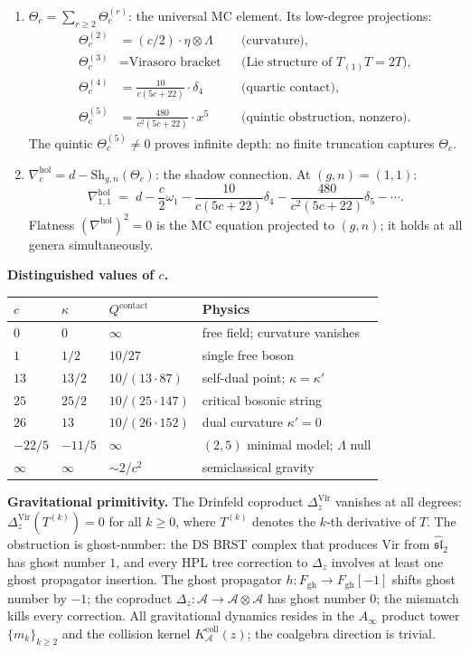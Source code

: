 \documentclass[11pt,reqno]{amsart}
\theoremstyle{definition}
\theoremstyle{remark}
\providecommand{\cA}{\mathcal{A}}
\providecommand{\Vir}{\mathrm{Vir}}
\providecommand{\hol}{\mathrm{hol}}
\providecommand{\contact}{\mathrm{contact}}
\providecommand{\gh}{\mathrm{gh}}
\numberwithin{equation}{section}
\begin{document}
\begin{enumerate}[label=(\roman*),nosep]
\item $\Theta_c = \sum_{r \ge 2} \Theta_c^{(r)}$: the universal
MC element. Its low-degree projections:
\begin{align*}
\Theta_c^{(2)} &= (c/2) \cdot \eta \otimes \Lambda
 &&\text{(curvature)},\\
\Theta_c^{(3)} &= \text{Virasoro bracket}
 &&\text{(Lie structure of } T_{(1)}T = 2T\text{)},\\
\Theta_c^{(4)} &= \frac{10}{c(5c+22)} \cdot \delta_4
 &&\text{(quartic contact)},\\
\Theta_c^{(5)} &= \frac{480}{c^2(5c+22)} \cdot x^5
 &&\text{(quintic obstruction, nonzero)}.
\end{align*}
The quintic $\Theta_c^{(5)} \neq 0$ proves infinite depth: no
finite truncation captures $\Theta_c$.

\item $\nabla_c^{\hol} = d - \mathrm{Sh}_{g,n}(\Theta_c)$:
the shadow connection. At $(g,n) = (1,1)$:
\[
\nabla^{\hol}_{1,1}
\;=\; d - \frac{c}{2}\omega_1
- \frac{10}{c(5c+22)}\delta_4
- \frac{480}{c^2(5c+22)}\delta_5 - \cdots.
\]
Flatness $(\nabla^{\hol})^2 = 0$ is the MC equation projected
to $(g,n)$; it holds at all genera simultaneously.
\end{enumerate}

\medskip\noindent\textbf{Distinguished values of $c$.}\enspace
\begin{center}
\renewcommand{\arraystretch}{1.15}
\begin{tabular}{llll}
$c$ & $\kappa$ & $Q^{\contact}$ & Physics\\ \hline
$0$ & $0$ & $\infty$ & free field; curvature vanishes\\
$1$ & $1/2$ & $10/27$ & single free boson\\
$13$ & $13/2$ & $10/(13\cdot 87)$ & self-dual point;
$\kappa = \kappa'$\\
$25$ & $25/2$ & $10/(25 \cdot 147)$ & critical bosonic string\\
$26$ & $13$ & $10/(26 \cdot 152)$ & dual curvature $\kappa'=0$\\
$-22/5$ & $-11/5$ & $\infty$ & $(2,5)$ minimal model;
$\Lambda$ null\\
$\infty$ & $\infty$ & $\sim 2/c^2$ & semiclassical
gravity
\end{tabular}
\end{center}

\medskip\noindent\textbf{Gravitational primitivity.}\enspace
The Drinfeld coproduct $\Delta_z^{\Vir}$ vanishes at all degrees:
$\Delta_z^{\Vir}(T^{(k)}) = 0$ for all $k \ge 0$, where $T^{(k)}$
denotes the $k$-th derivative of $T$. The obstruction is
ghost-number: the DS BRST complex that produces $\Vir$ from
$\widehat{\mathfrak{sl}}_2$ has ghost number $1$, and every HPL
tree correction to $\Delta_z$ involves at least one ghost
propagator insertion. The ghost propagator
$h \colon F_{\gh} \to F_{\gh}[-1]$ shifts ghost number by $-1$;
the coproduct $\Delta_z \colon \cA \to \cA \otimes \cA$ has
ghost number $0$; the mismatch kills every correction. All
gravitational dynamics resides in the $A_\infty$ product
tower $\{m_k\}_{k \ge 2}$ and the collision kernel
$K_\cA^{\mathrm{coll}}(z)$;
the coalgebra direction is trivial.
\end{document}
